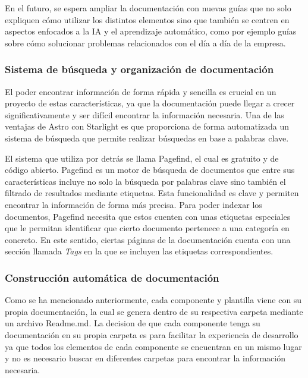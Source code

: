 En el futuro, se espera ampliar la documentación con nuevas guías
que no solo expliquen cómo utilizar los distintos elementos sino que
también se centren en aspectos enfocados a la IA y el aprendizaje
automático, como por ejemplo guías sobre cómo solucionar problemas
relacionados con el día a día de la empresa.

\subsubsection{Sistema de búsqueda y organización de documentación}
El poder encontrar información de forma rápida y sencilla es crucial
en un proyecto de estas características, ya que la documentación
puede llegar a crecer significativamente y ser difícil encontrar
la información necesaria. Una de las ventajas de Astro con Starlight
es que proporciona de forma automatizada un sistema de búsqueda 
que permite realizar búsquedas en base a palabras clave.\medskip

El sistema que utiliza por detrás se llama Pagefind, el cual es gratuito 
y de código abierto. Pagefind es un motor de búsqueda de documentos
que entre sus características incluye no solo la búsqueda por palabras
clave sino también el filtrado de resultados mediante etiquetas. Esta 
funcionalidad es clave y permiten encontrar la información de forma más precisa. 
Para poder indexar los documentos, Pagefind necesita que estos cuenten con
unas etiquetas especiales que le permitan identificar que cierto documento
pertenece a una categoría en concreto. En este sentido, ciertas páginas
de la documentación cuenta con una sección llamada \textit{Tags} en la que
se incluyen las etiquetas correspondientes.


\subsubsection{Construcción automática de documentación}
Como se ha mencionado anteriormente, cada componente y plantilla 
viene con su propia documentación, la cual se genera dentro de su
respectiva carpeta mediante un archivo Readme.md. La decision de 
que cada componente tenga su documentación en su propia carpeta
es para facilitar la experiencia de desarrollo ya que todos los
elementos de cada componente se encuentran en un mismo lugar y no
es necesario buscar en diferentes carpetas para encontrar la
información necesaria.\medskip

